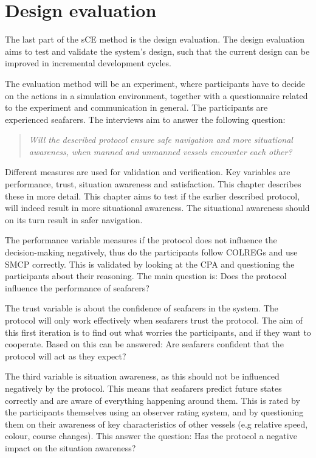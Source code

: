 \chapter{Design evaluation}
\label{ch:evaluation}
The last part of the sCE method is the design evaluation. The design evaluation aims to test and validate the system’s design, such that the current design can be improved in incremental development cycles. 

The evaluation method will be an experiment, where participants have to decide on the actions in a simulation environment, together with a questionnaire related to the experiment and communication in general. The participants are experienced seafarers. The interviews aim to answer the following question:
\begin{quotation}
	\emph{Will the described protocol ensure safe navigation and more situational awareness, when manned and unmanned vessels encounter each other?}
\end{quotation}
Different measures are used for validation and verification. Key variables are performance, trust, situation awareness and satisfaction. This chapter describes these in more detail. This chapter aims to test if the earlier described protocol, will indeed result in more situational awareness. The situational awareness should on its turn result in safer navigation.

The performance variable measures if the protocol does not influence the decision-making negatively, thus do the participants follow COLREGs and use SMCP correctly. This is validated by looking at the \ac{CPA} and questioning the participants about their reasoning. The main question is: Does the protocol influence the performance of seafarers?

The trust variable is about the confidence of seafarers in the system. The protocol will only work effectively when seafarers trust the protocol. The aim of this first iteration is to find out what worries the participants, and if they want to cooperate. Based on this can be answered: Are seafarers confident that the protocol will act as they expect?

The third variable is situation awareness, as this should not be influenced negatively by the protocol. This means that seafarers predict future states correctly and are aware of everything happening around them. This is rated by the participants themselves using an observer rating system, and by questioning them on their awareness of key characteristics of other vessels (e.g relative speed, colour, course changes). This answer the question: Has the protocol a negative impact on the situation awareness?

